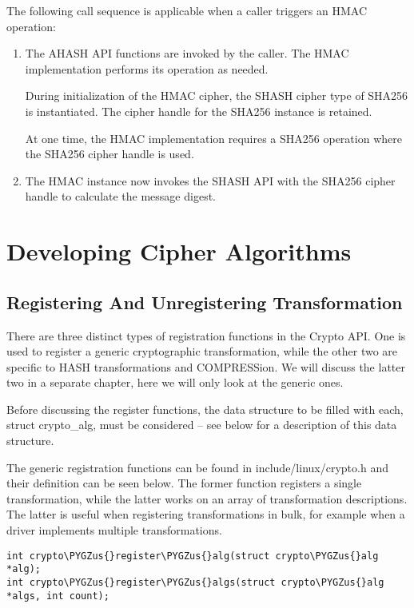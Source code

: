 \documentclass[a4paper,8pt,english]{sphinxmanual}
\def\PYGZus{\char`\_}
\begin{document}
The following call sequence is applicable when a caller triggers an HMAC
operation:
\begin{enumerate}
\item {} 
The AHASH API functions are invoked by the caller. The HMAC
implementation performs its operation as needed.

During initialization of the HMAC cipher, the SHASH cipher type of
SHA256 is instantiated. The cipher handle for the SHA256 instance is
retained.

At one time, the HMAC implementation requires a SHA256 operation
where the SHA256 cipher handle is used.

\item {} 
The HMAC instance now invokes the SHASH API with the SHA256 cipher
handle to calculate the message digest.

\end{enumerate}


\chapter{Developing Cipher Algorithms}
\label{crypto/devel-algos:developing-cipher-algorithms}\label{crypto/devel-algos::doc}

\section{Registering And Unregistering Transformation}
\label{crypto/devel-algos:registering-and-unregistering-transformation}
There are three distinct types of registration functions in the Crypto
API. One is used to register a generic cryptographic transformation,
while the other two are specific to HASH transformations and
COMPRESSion. We will discuss the latter two in a separate chapter, here
we will only look at the generic ones.

Before discussing the register functions, the data structure to be
filled with each, struct crypto\_alg, must be considered -- see below
for a description of this data structure.

The generic registration functions can be found in
include/linux/crypto.h and their definition can be seen below. The
former function registers a single transformation, while the latter
works on an array of transformation descriptions. The latter is useful
when registering transformations in bulk, for example when a driver
implements multiple transformations.

\begin{Verbatim}[commandchars=\\\{\}]
int crypto\PYGZus{}register\PYGZus{}alg(struct crypto\PYGZus{}alg *alg);
int crypto\PYGZus{}register\PYGZus{}algs(struct crypto\PYGZus{}alg *algs, int count);
\end{Verbatim}
\end{document}
